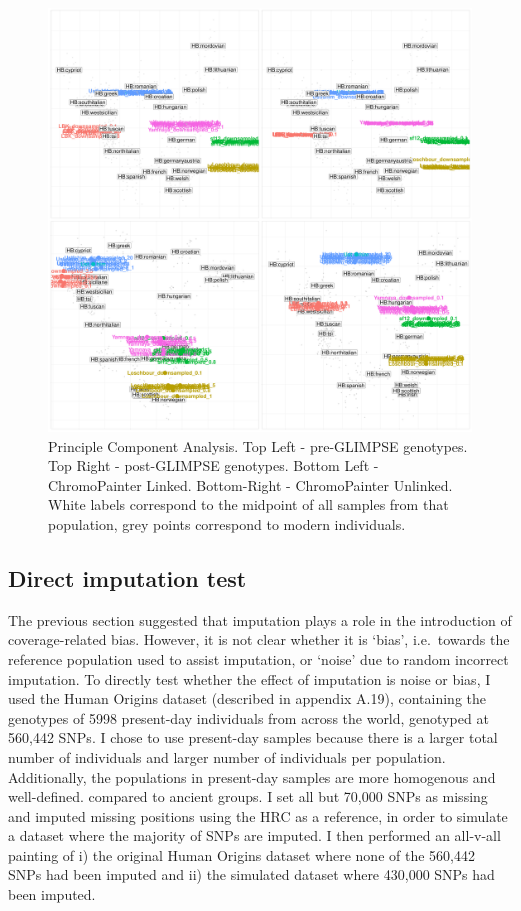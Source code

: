 \begin{figure}[htp]
    \centering
    \includegraphics[width=1.0\textwidth]{../images/chapter1/CP_linked_unlinked_pre_post_GLIMPSE_PCA.pdf}
    \caption{Principle Component Analysis. Top Left - pre-GLIMPSE genotypes. Top Right - post-GLIMPSE genotypes. Bottom Left - ChromoPainter Linked. Bottom-Right - ChromoPainter Unlinked. White labels correspond to the midpoint of all samples from that population, grey points correspond to modern individuals.}
    \label{fig:pre_GLIMPSE_PCA}
\end{figure}

\subsection{Direct imputation test} \label{DirectImputationTest}

The previous section suggested that imputation plays a role in the introduction of coverage-related bias. However, it is not clear whether it is `bias', i.e.\ towards the reference population used to assist imputation, or `noise' due to random incorrect imputation. To directly test whether the effect of imputation is noise or bias, I used the Human Origins dataset (described in appendix A.19), containing the genotypes of 5998 present-day individuals from across the world, genotyped at 560,442 SNPs. I chose to use present-day samples because there is a larger total number of individuals and larger number of individuals per population. Additionally, the populations in present-day samples are more homogenous and well-defined. compared to ancient groups. I set all but 70,000 SNPs as missing and imputed missing positions using the HRC as a reference, in order to simulate a dataset where the majority of SNPs are imputed. I then performed an all-v-all painting of i) the original Human Origins dataset where none of the 560,442 SNPs had been imputed and ii) the simulated dataset where 430,000 SNPs had been imputed. 

